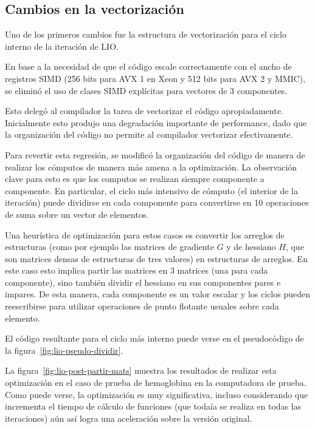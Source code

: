 
\subsection{Cambios en la vectorizaci\'on}

Uno de los primeros cambios fue la estructura de vectorizaci\'on para el ciclo
interno de la iteraci\'on de LIO.

En base a la necesidad de que el c\'odigo escale correctamente con el ancho de registros
SIMD (256 bits para AVX 1 en Xeon y 512 bits para AVX 2 y MMIC), se elimin\'o el
uso de clases SIMD expl\'icitas para vectores de 3 componentes.

Esto deleg\'o al compilador la tarea de vectorizar el c\'odigo apropiadamente. Inicialmente
esto produjo una degradaci\'on importante de performance, dado que la organizaci\'on del
c\'odigo no permite al compilador vectorizar efectivamente.

Para revertir esta regresi\'on, se modific\'o la organizaci\'on del c\'odigo de manera de
realizar los c\'omputos de manera m\'as amena a la optimizaci\'on. La observaci\'on clave
para esto es que los computos se realizan siempre componente a componente. En particular,
el ciclo m\'as intensivo de c\'omputo (el interior de la iteraci\'on) puede dividirse
en cada componente para convertirse en 10 operaciones de suma sobre un vector de
elementos.

Una heur\'istica de optimizaci\'on para estos casos es convertir los arreglos de
estructuras (como por ejemplo las matrices de gradiente $G$ y de hessiano $H$, que
son matrices densas de estructuras de tres valores) en estructuras de arreglos.
En este caso esto implica partir las matrices en 3 matrices (una para cada
componente), sino tambi\'en dividir el hessiano en sus componentes pares e impares.
De esta manera, cada componente es un valor escalar y los ciclos pueden reescribirse
para utilizar operaciones de punto flotante usuales sobre cada elemento.

El c\'odigo resultante para el ciclo m\'as interno puede verse en el pseudoc\'odigo
de la figura~\ref{fig:lio-pseudo-dividir}.


La figura~\ref{fig:lio-post-partir-mats} muestra los resultados de realizar esta
optimizaci\'on en el caso de prueba de hemoglobina en la computadora de prueba.
Como puede verse, la optimizaci\'on es muy significativa, incluso considerando
que incrementa el tiempo de c\'alculo de funciones (que toda\'ia se realiza en
todas las iteraciones) a\'un as\'i logra una aceleraci\'on sobre la versi\'on
original.

